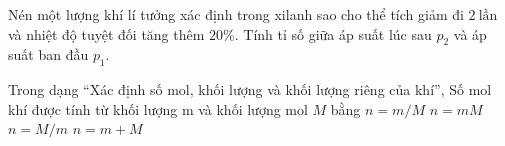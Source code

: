\begin{ex}
Nén một lượng khí lí tưởng xác định trong xilanh sao cho thể tích giảm đi $2\ \text{lần}$ và nhiệt độ tuyệt đối tăng thêm $20\%$. Tính tỉ số giữa áp suất lúc sau $p_2$ và áp suất ban đầu $p_1$.
\end{ex}

\begin{ex}
Trong dạng “Xác định số mol, khối lượng và khối lượng riêng của khí”, Số mol khí được tính từ khối lượng m và khối lượng mol $M$ bằng
\choice
{\True $n=m/M$}
{$n=mM$}
{$n=M/m$}
{$n=m+M$}
\end{ex}

